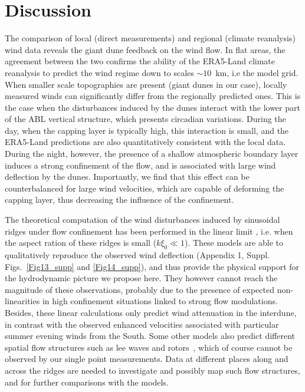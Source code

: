 \section{Discussion}
The comparison of local (direct measurements) and regional (climate reanalysis) wind data reveals the giant dune feedback on the wind flow. In flat areas, the agreement between the two confirms the ability of the ERA5-Land climate reanalysis to predict the wind regime down to scales $\sim10$~km, i.e the model grid. When smaller scale topographies are present (giant dunes in our case), locally measured winds can significantly differ from the regionally predicted ones. This is the case when the disturbances induced by the dunes interact with the lower part of the ABL vertical structure, which presents circadian variations. During the day, when the capping layer is typically high, this interaction is small, and the ERA5-Land predictions are also quantitatively consistent with the local data. During the night, however, the presence of a shallow atmospheric boundary layer induces a strong confinement of the flow, and is associated with large wind deflection by the dunes. Importantly, we find that this effect can be counterbalanced for large wind velocities, which are capable of deforming the capping layer, thus decreasing the influence of the confinement.

The theoretical computation of the wind disturbances induced by sinusoidal ridges under flow confinement has been performed in the linear limit \citep{andreotti2009, Andreotti2012}, i.e. when the aspect ration of these ridges is small ($k\xi_0 \ll 1$). These models are able to qualitatively reproduce the observed wind deflection (Appendix 1, Suppl. Figs.~\ref{Fig13_supp} and \ref{Fig14_supp}), and thus provide the physical support for the hydrodynamic picture we propose here. They however cannot reach the magnitude of these observations, probably due to the presence of expected non-linearities in high confinement situations linked to strong flow modulations. Besides, these linear calculations only predict wind attenuation in the interdune, in contrast with the observed enhanced velocities associated with particular summer evening winds from the South. Some other models also predict different spatial flow structures such as lee waves and rotors~\citep{baines1995, Vosper2004}, which of course cannot be observed by our single point measurements. Data at different places along and across the ridges are needed to investigate and possibly map such flow structures, and for further comparisons with the models.

